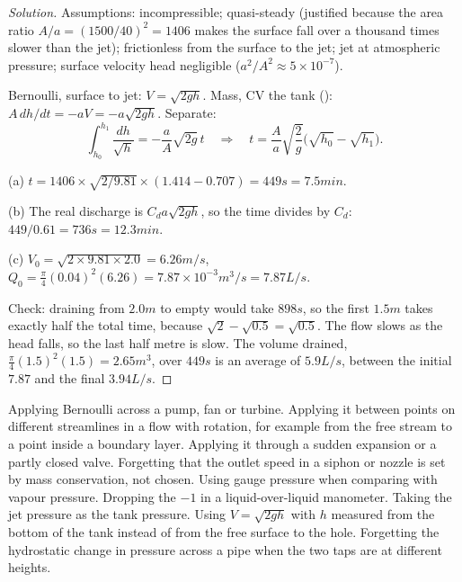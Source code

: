 \begin{proof}[Solution]
Assumptions: incompressible; quasi-steady (justified because the area ratio $A/a = (1500/40)^2 = 1406$ makes the surface fall over a thousand times slower than the jet); frictionless from the surface to the jet; jet at atmospheric pressure; surface velocity head negligible ($a^2/A^2 \approx 5\times10^{-7}$).

Bernoulli, surface to jet: $V = \sqrt{2gh}$. Mass, CV the tank (): $A\,dh/dt = -aV = -a\sqrt{2gh}$. Separate:
\[
\int_{h_0}^{h_1}\frac{dh}{\sqrt h} = -\frac{a}{A}\sqrt{2g}\,t\quad\Rightarrow\quad t = \frac{A}{a}\sqrt{\frac{2}{g}}\big(\sqrt{h_0} - \sqrt{h_1}\big).
\]

(a) $t = 1406\times\sqrt{2/9.81}\times(1.414 - 0.707) = 449\unit{s} = 7.5\unit{min}$.

(b) The real discharge is $C_d a\sqrt{2gh}$, so the time divides by $C_d$: $449/0.61 = 736\unit{s} = 12.3\unit{min}$.

(c) $V_0 = \sqrt{2\times9.81\times2.0} = 6.26\unit{m/s}$, $Q_0 = \tfrac{\pi}{4}(0.04)^2(6.26) = 7.87\times10^{-3}\unit{m^3/s} = 7.87\unit{L/s}$.

Check: draining from $2.0\unit{m}$ to empty would take $898\unit{s}$, so the first $1.5\unit{m}$ takes exactly half the total time, because $\sqrt2 - \sqrt{0.5} = \sqrt{0.5}$. The flow slows as the head falls, so the last half metre is slow. The volume drained, $\tfrac{\pi}{4}(1.5)^2(1.5) = 2.65\unit{m^3}$, over $449\unit{s}$ is an average of $5.9\unit{L/s}$, between the initial $7.87$ and the final $3.94\unit{L/s}$.
\end{proof}

\begin{trap}
Applying Bernoulli across a pump, fan or turbine. Applying it between points on different streamlines in a flow with rotation, for example from the free stream to a point inside a boundary layer. Applying it through a sudden expansion or a partly closed valve. Forgetting that the outlet speed in a siphon or nozzle is set by mass conservation, not chosen. Using gauge pressure when comparing with vapour pressure. Dropping the $-1$ in a liquid-over-liquid manometer. Taking the jet pressure as the tank pressure. Using $V = \sqrt{2gh}$ with $h$ measured from the bottom of the tank instead of from the free surface to the hole. Forgetting the hydrostatic change in pressure across a pipe when the two taps are at different heights.
\end{trap}

